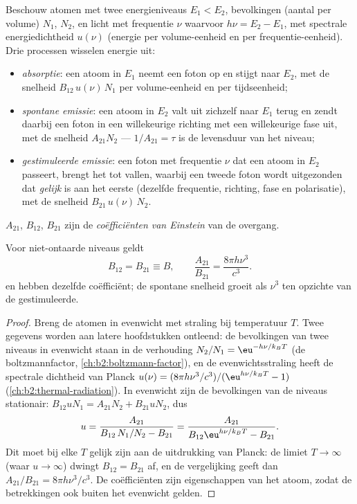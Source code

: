 \begin{definition}\label{def:b2:laser:processes}
Beschouw atomen met twee energieniveaus $E_1 < E_2$, bevolkingen (aantal
per volume) $N_1$, $N_2$, en licht met frequentie $\nu$ waarvoor
$h\nu = E_2 - E_1$, met spectrale energiedichtheid $u(\nu)$ (energie per
volume-eenheid en per frequentie-eenheid). Drie processen wisselen energie uit:
\begin{itemize}
\item \emph{absorptie}: een atoom in
      $E_1$ neemt een foton op en stijgt naar $E_2$, met de snelheid
      $B_{12}\,u(\nu)\,N_1$ per volume-eenheid en per tijdseenheid;
\item \emph{spontane emissie}: een atoom
      in $E_2$ valt uit zichzelf naar $E_1$ terug en zendt daarbij een foton
      in een willekeurige
      richting met een willekeurige fase uit, met de snelheid $A_{21}N_2$ ---
      $1/A_{21} = \tau$ is de levensduur van het niveau;
\item \emph{gestimuleerde emissie}: een foton
      met frequentie $\nu$ dat een atoom in $E_2$ passeert, brengt het tot vallen,
      waarbij een tweede foton wordt uitgezonden dat \emph{gelijk} is aan
      het eerste (dezelfde
      frequentie, richting, fase en polarisatie), met de snelheid
      $B_{21}\,u(\nu)\,N_2$.
\end{itemize}
$A_{21}$, $B_{12}$, $B_{21}$ zijn de \emph{coëfficiënten van
Einstein} van de overgang.
\end{definition}

\begin{proposition}\label{prop:b2:laser:einstein}
Voor niet-ontaarde niveaus geldt
\[
B_{12} = B_{21} \equiv B, \qquad
\frac{A_{21}}{B_{21}} = \frac{8\pi h\nu^3}{c^3}.
\]
 en  hebben dezelfde coëfficiënt; de
spontane snelheid groeit als $\nu^3$ ten opzichte van de gestimuleerde.
\end{proposition}

\begin{proof}
Breng de atomen in evenwicht met straling bij temperatuur $T$. Twee
gegevens worden aan latere hoofdstukken ontleend: de bevolkingen van twee niveaus
in evenwicht staan in de verhouding $N_2/N_1 = \eu^{-h\nu/k_BT}$ (de
boltzmannfactor, \cref{ch:b2:boltzmann-factor}), en de
evenwichtsstraling heeft de spectrale dichtheid van Planck
$u(\nu) = (8\pi h\nu^3/c^3)/(\eu^{h\nu/k_BT} - 1)$
(\cref{ch:b2:thermal-radiation}). In evenwicht zijn de bevolkingen van de niveaus
stationair: $B_{12}uN_1 = A_{21}N_2 + B_{21}uN_2$, dus
\[
u = \frac{A_{21}}{B_{12}\,N_1/N_2 - B_{21}}
  = \frac{A_{21}}{B_{12}\eu^{h\nu/k_BT} - B_{21}}.
\]
Dit moet bij elke $T$ gelijk zijn aan de uitdrukking van Planck: de limiet
$T \to \infty$ (waar $u \to \infty$) dwingt $B_{12} = B_{21}$ af, en de
vergelijking geeft dan $A_{21}/B_{21} = 8\pi h\nu^3/c^3$. De
coëfficiënten zijn eigenschappen van het atoom, zodat de betrekkingen ook buiten
het evenwicht gelden.
\end{proof}

